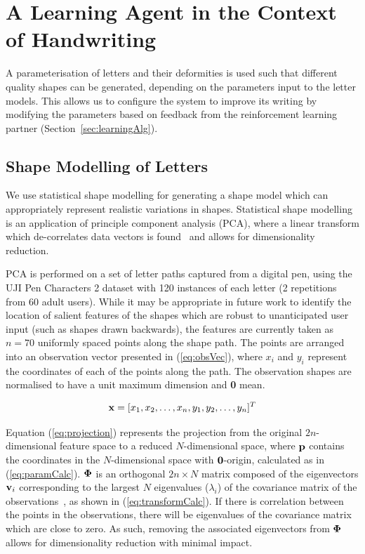 \documentclass{sig-alternate}
\begin{document}
\section{A Learning Agent in the Context of Handwriting} \label{sec:learningAlgorithm}

A parameterisation of letters and their deformities is used such that different
quality shapes can be generated, depending on the parameters input to the letter
models. This allows us to configure the system to improve its writing by
modifying the parameters based on feedback from the reinforcement learning
partner (Section~\ref{sec:learningAlg}). 


\subsection{Shape Modelling of Letters} \label{sec:writingGeneration}

We use statistical shape modelling for generating a shape model which can
appropriately represent realistic variations in shapes. Statistical shape
modelling is an application of principle component analysis (PCA), where a
linear transform which de-correlates data vectors is found~\cite{Stegmann2002}
and allows for dimensionality reduction. 

PCA is performed on a set of letter paths captured from a digital pen, using the
UJI Pen Characters 2 dataset \cite{Llorens2008} with 120 instances of each
letter (2 repetitions from 60 adult users). While it may be appropriate in
future work to identify the location of salient features of the shapes which are
robust to unanticipated user input (such as shapes drawn backwards), the
features are currently taken as $n=70$ uniformly spaced points along the shape
path. The points are arranged into an observation vector presented in
(\ref{eq:obsVec}), where $x_i$ and $y_i$ represent the coordinates of each of
the points along the path. The observation shapes are normalised to have a unit
maximum dimension and {\bf 0} mean.

\begin{equation}\label{eq:obsVec}
{\bf x} = [x_1, x_2, \ldots, x_n, y_1, y_2, \ldots, y_n]^T
\end{equation}

Equation (\ref{eq:projection}) represents the projection from the original
$2n$-dimensional feature space to a reduced $N$-dimensional space, where ${\bf
p}$ contains the coordinates in the $N$-dimensional space with ${\bf 0}$-origin,
calculated as in (\ref{eq:paramCalc}).  ${\bf \Phi }$ is an orthogonal $2n\times
N$ matrix composed of the eigenvectors ${\bf v}_i$ corresponding to the largest
$N$ eigenvalues ($\lambda_i$) of the covariance matrix of the
observations~\cite{Stegmann2002}, as shown in (\ref{eq:transformCalc}).  If
there is correlation between the points in the observations, there will be
eigenvalues of the covariance matrix which are close to zero. As such, removing
the associated eigenvectors from ${\bf \Phi}$ allows for dimensionality
reduction with minimal impact.
\end{document}
